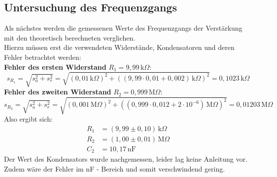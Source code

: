 \subsection{Untersuchung des Frequenzgangs}
Als nächstes werden die gemessenen Werte des Frequenzgangs der Verstärkung
mit den theoretisch berechneten verglichen. \\
Hierzu müssen erst die verwendeten Widerstände, 
Kondensatoren und deren Fehler betrachtet werden:\\
\textbf{Fehler des ersten Widerstand} $R_1 = 9,99\,\text{k}\Omega$:
\begin{equation}
    s_{R_1} = \sqrt{s_a^2+s_r^2} = \sqrt{(0,01\,\text{k}\Omega)^2+((9,99\cdot0,01+0,002)\,\text{k}\Omega)^2} = 0,1023\,\text{k}\Omega
\end{equation}
\textbf{Fehler des zweiten Widerstand} $R_2 = 0,999\,\text{M}\Omega$:
\begin{equation}
    s_{R_2} = \sqrt{s_a^2+s_r^2} = \sqrt{(0,001\,\text{M}\Omega)^2+((0,999\cdot0,012+2\cdot10^{-6})\,\text{M}\Omega)^2} = 0,01203\,\text{M}\Omega
\end{equation}
Also ergibt sich:
\begin{align}
    R_1 &= (9,99 \pm 0,10)\,\text{k}\Omega\\
    R_2 &= (1,00 \pm 0,01)\,\text{M}\Omega\\
    C_2 &= 10,17\,\text{nF}
\end{align}
Der Wert des Kondensators wurde nachgemessen, leider lag keine Anleitung vor. 
Zudem wäre der Fehler im nF - Bereich und somit verschwindend gering. \\

